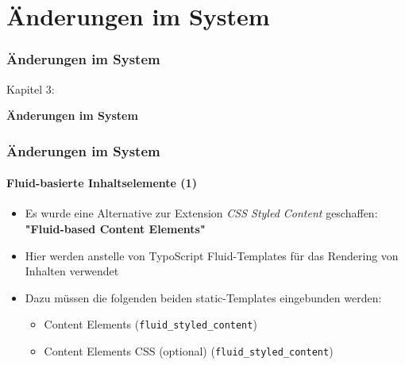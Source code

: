 %

\section{Änderungen im System}
\begin{frame}[fragile]
	\frametitle{Änderungen im System}

	\begin{center}\huge{Kapitel 3:}\end{center}
	\begin{center}\huge{\color{typo3darkgrey}\textbf{Änderungen im System}}\end{center}

\end{frame}


\begin{frame}[fragile]
	\frametitle{Änderungen im System}
	\framesubtitle{Fluid-basierte Inhaltselemente (1)}

	\begin{itemize}

		\item Es wurde eine Alternative zur Extension \textit{CSS Styled Content} geschaffen:\newline
			\textbf{"Fluid-based Content Elements"}

		\item Hier werden anstelle von TypoScript Fluid-Templates für das Rendering von Inhalten verwendet

		\item Dazu müssen die folgenden beiden static-Templates eingebunden werden:

			\begin{itemize}
				\item Content Elements (\texttt{fluid\_styled\_content})
				\item Content Elements CSS (optional) (\texttt{fluid\_styled\_content})
			\end{itemize}

	\end{itemize}

\end{frame}

